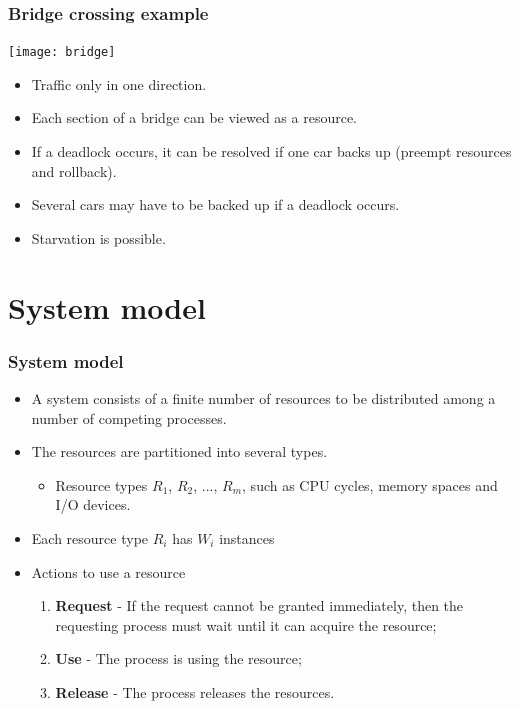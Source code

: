 \documentclass[CJKutf8,xcolor=pdftex,dvipsnames,table]{beamer}
\begin{document}
\begin{CJK*}{UTF8}{song}
  \begin{frame}
  \frametitle{Bridge crossing example} \pause
  \begin{center}
    \texttt{[image: bridge]} \pause
  \end{center}
  \begin{itemize}
  \item{Traffic only in one direction.} \pause
  \item{Each section of a bridge can be viewed as a resource.} \pause
  \item{If a deadlock occurs, it can be resolved if one car backs up (preempt resources and rollback).} \pause
  \item{Several cars may have to be backed up if a deadlock occurs.} \pause
  \item{Starvation is possible.}
  \end{itemize}
  \end{frame}

\section{System model}
  
  \begin{frame}
  \frametitle{System model} \pause
  \begin{itemize}
  \item{A system consists of a finite number of resources to be distributed among a number of competing processes.} \pause
  \item{The resources are partitioned into several types.} \pause
    \begin{itemize}
    \item{Resource types $R_1$, $R_2$, ..., $R_m$, such as CPU cycles, memory spaces and I/O devices.} \pause
    \end{itemize}
  \item{Each resource type $R_i$ has $W_i$ instances} \pause
  \item{Actions to use a resource} \pause
    \begin{enumerate}
    \item{\textbf{Request} \pause - If the request cannot be granted immediately, then the requesting process must wait until it can acquire the resource;} \pause
    \item{\textbf{Use} \pause - The process is using the resource;} \pause
    \item{\textbf{Release} \pause - The process releases the resources.} 
    \end{enumerate}
  \end{itemize}
  \end{frame}
  

\end{CJK*}
\end{document}
